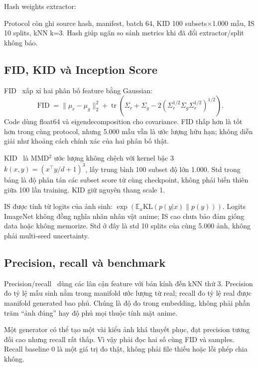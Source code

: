 \documentclass[11pt,a4paper]{article}
\begin{document}
Hash weights extractor:
\begin{quote}\footnotesize{}\end{quote}
Protocol còn ghi source hash, manifest, batch 64, KID 100 subsets$\times$1.000 mẫu, IS 10 splits, kNN k=3. Hash giúp ngăn so sánh metrics khi đã đổi extractor/split không báo.

\subsection{FID, KID và Inception Score}
FID~\cite{fid} xấp xỉ hai phân bố feature bằng Gaussian:
\begin{equation}
\operatorname{FID}=\|\mu_r-\mu_g\|_2^2+\operatorname{tr}(\Sigma_r+\Sigma_g-2(\Sigma_r^{1/2}\Sigma_g\Sigma_r^{1/2})^{1/2}).
\end{equation}
Code dùng float64 và eigendecomposition cho covariance. FID thấp hơn là tốt hơn trong cùng protocol, nhưng 5.000 mẫu vẫn là ước lượng hữu hạn; không diễn giải như khoảng cách chính xác của hai phân bố thật.

KID~\cite{kid} là MMD$^2$ ước lượng không chệch với kernel bậc 3 $k(x,y)=(x^\top y/d+1)^3$, lấy trung bình 100 subset độ lớn 1.000. Std trong bảng là độ phân tán các subset score từ cùng checkpoint, không phải biến thiên giữa 100 lần training. KID giữ nguyên thang scale 1.

IS được tính từ logits của ảnh sinh: $\exp(\mathbb E_x\mathrm{KL}(p(y|x)\|p(y)))$. Logits ImageNet không đồng nghĩa nhãn nhân vật anime; IS cao chưa bảo đảm giống data hoặc không memorize. Std ở đây là std 10 splits của cùng 5.000 ảnh, không phải multi-seed uncertainty.
\clearpage

\subsection{Precision, recall và benchmark}
Precision/recall~\cite{precisionrecall} dùng các lân cận feature với bán kính đến kNN thứ 3. Precision đo tỷ lệ mẫu sinh nằm trong manifold ước lượng từ real; recall đo tỷ lệ real được manifold generated bao phủ. Chúng là độ đo trong embedding, không phải phần trăm ``ảnh đúng'' hay độ phủ mọi thuộc tính mặt anime.

Một generator có thể tạo một vài kiểu ảnh khá thuyết phục, đạt precision tương đối cao nhưng recall rất thấp. Vì vậy phải đọc hai số cùng FID và samples. Recall baseline 0 là một giá trị đo thật, không phải file thiếu hoặc lỗi phép chia không.
\end{document}
